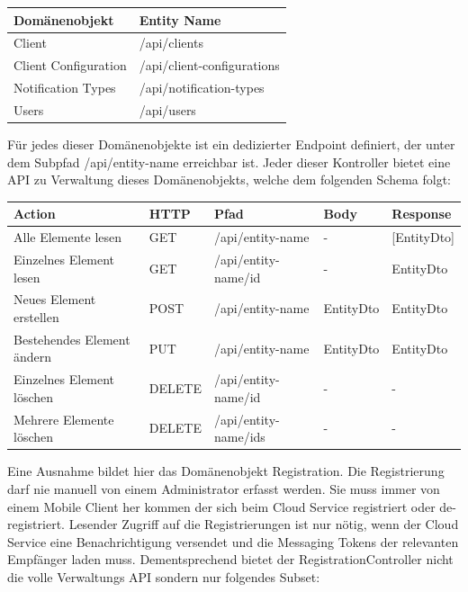 \begin{table}[h]
    \centering
    \begin{tabular}{|l|p{13cm}|}
        \hline
        \textbf{Domänenobjekt} & \textbf{Entity Name} \\
        \hline
        Client         & /api/clients \\
        \hline
        Client Configuration         & /api/client-configurations \\
        \hline
        Notification Types         & /api/notification-types \\
        \hline
        Users         & /api/users \\
        \hline
    \end{tabular}\label{tab:adminapimethods}
\end{table}

Für jedes dieser Domänenobjekte ist ein dedizierter Endpoint definiert, der unter dem Subpfad /api/entity-name erreichbar ist.
Jeder dieser Kontroller bietet eine API zu Verwaltung dieses Domänenobjekts, welche dem folgenden Schema folgt:

\begin{table}[h]
    \centering
    \begin{tabular}{|l|l|l|l|l|}
        \hline
        \textbf{Action} & \textbf{HTTP} & \textbf{Pfad} & \textbf{Body} & \textbf{Response} \\
        \hline
            Alle Elemente lesen         & GET & /api/entity-name & - & [EntityDto] \\
        \hline
            Einzelnes Element lesen         & GET & /api/entity-name/id & - & EntityDto \\
        \hline
            Neues Element erstellen         & POST & /api/entity-name  & EntityDto & EntityDto\\
        \hline
            Bestehendes Element ändern          & PUT & /api/entity-name  & EntityDto & EntityDto\\
        \hline
            Einzelnes Element löschen          & DELETE & /api/entity-name/id  & - & -  \\
        \hline
            Mehrere Elemente löschen          & DELETE & /api/entity-name/ids  & - & - \\
        \hline
    \end{tabular}\label{tab:apimethods}
\end{table}

Eine Ausnahme bildet hier das Domänenobjekt Registration.
Die Registrierung darf nie manuell von einem Administrator erfasst werden.
Sie muss immer von einem Mobile Client her kommen der sich beim Cloud Service registriert oder de-registriert.
Lesender Zugriff auf die Registrierungen ist nur nötig, wenn der Cloud Service eine Benachrichtigung versendet und die Messaging Tokens der relevanten Empfänger laden muss.
Dementsprechend bietet der RegistrationController nicht die volle Verwaltungs API sondern nur folgendes Subset:

